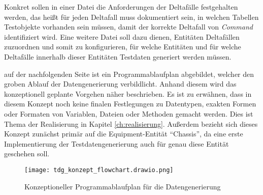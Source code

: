 Konkret sollen in einer Datei die Anforderungen der Deltafälle festgehalten werden, das heißt für jeden Deltafall muss dokumentiert sein, in welchen Tabellen Testobjekte vorhanden sein müssen, damit der korrekte Deltafall von \textit{Command} identifiziert wird. Eine weitere Datei soll dazu dienen, Entitäten Deltafällen zuzuordnen und somit zu konfigurieren, für welche Entitäten und für welche Deltafälle innerhalb dieser Entitäten Testdaten generiert werden müssen.

auf der nachfolgenden Seite ist ein Programmablaufplan abgebildet, welcher den groben Ablauf der Datengenerierung verbildlicht. Anhand diesem wird das konzeptionell geplante Vorgehen näher beschrieben. Es ist zu erwähnen, dass in diesem Konzept noch keine finalen Festlegungen zu Datentypen, exakten Formen oder Formaten von Variablen, Dateien oder Methoden gemacht werden. Dies ist Thema der Realisierung in Kapitel \ref{ch:realisierung}. Außerdem bezieht sich dieses Konzept zunächst primär auf die Equipment-Entität \enquote{Chassis}, da eine erste Implementierung der Testdatengenerierung auch für genau diese Entität geschehen soll.

\begin{figure}[htp]
    \centering
    \texttt{[image: tdg\_konzept\_flowchart.drawio.png]}
    \caption{Konzeptioneller Programmablaufplan für die Datengenerierung\footnotemark}
\end{figure}

